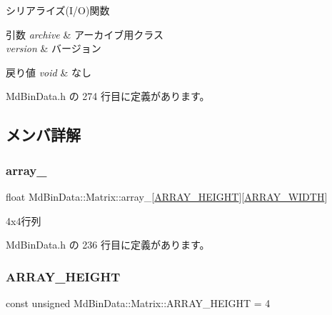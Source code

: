 シリアライズ(I/O)関数 


\begin{DoxyParams}{引数}
{\em archive} & アーカイブ用クラス \\
\hline
{\em version} & バージョン \\
\hline
\end{DoxyParams}

\begin{DoxyRetVals}{戻り値}
{\em void} & なし \\
\hline
\end{DoxyRetVals}


 Md\+Bin\+Data.\+h の 274 行目に定義があります。



\subsection{メンバ詳解}
\mbox{\label{class_md_bin_data_1_1_matrix_a9b13d72966bb7b35e1c5acbfef92095f}} 
\subsubsection{\texorpdfstring{array\+\_\+}{array\_}}
{\footnotesize\ttfamily float Md\+Bin\+Data\+::\+Matrix\+::array\+\_\+\mbox{[}\mbox{\hyperlink{class_md_bin_data_1_1_matrix_a69ea4171a8c2fbf1728396463bfd9bc8}{A\+R\+R\+A\+Y\+\_\+\+H\+E\+I\+G\+HT}}\mbox{]}\mbox{[}\mbox{\hyperlink{class_md_bin_data_1_1_matrix_adbf2f2e21df64ab4559b9c98b88a6c59}{A\+R\+R\+A\+Y\+\_\+\+W\+I\+D\+TH}}\mbox{]}\hspace{0.3cm}{\ttfamily [private]}}



4x4行列 



 Md\+Bin\+Data.\+h の 236 行目に定義があります。

\mbox{\label{class_md_bin_data_1_1_matrix_a69ea4171a8c2fbf1728396463bfd9bc8}} 
\subsubsection{\texorpdfstring{A\+R\+R\+A\+Y\+\_\+\+H\+E\+I\+G\+HT}{ARRAY\_HEIGHT}}
{\footnotesize\ttfamily const unsigned Md\+Bin\+Data\+::\+Matrix\+::\+A\+R\+R\+A\+Y\+\_\+\+H\+E\+I\+G\+HT = 4\hspace{0.3cm}{\ttfamily [static]}}



